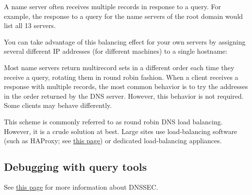 \protect\hypertarget{part0024_split_017.htmlux5cux23_idIndexMarker2045}{}{}\protect\hypertarget{part0024_split_017.htmlux5cux23_idIndexMarker2046}{}{}A\protect\hypertarget{part0024_split_017.htmlux5cux23_idIndexMarker2047}{}{}
name server often receives multiple records in response to a query. For
example, the response to a query for the name servers of the root domain
would list all 13 servers.

You can take advantage of this balancing effect for your own servers by
assigning several different IP addresses (for different machines) to a
single hostname:


Most name servers return multirecord sets in a different order each time
they receive a query, rotating them in round robin fashion. When a
client receives a response with multiple records, the most common
behavior is to try the addresses in the order returned by the DNS
server. However, this behavior is not required. Some clients may behave
differently.

This scheme is commonly referred to as round robin DNS load balancing.
However, it is a crude solution at best. Large sites use load-balancing
software (such as HAProxy; see
\protect\hyperlink{part0027_split_030.htmlux5cux23_idTextAnchor1269}{this
page}) or dedicated load-balancing appliances.

\protect\hypertarget{part0024_split_018.html}{}{}

\hypertarget{part0024_split_018.htmlux5cux23_idContainer1069}{}
\hypertarget{part0024_split_018.htmlux5cux23calibre_pb_17}{%
\subsection[Debugging with query
tools]{\texorpdfstring{\protect\hypertarget{part0024_split_018.htmlux5cux23_idTextAnchor863}{}{}Debugging
with query
tools}{Debugging with query tools}}\label{part0024_split_018.htmlux5cux23calibre_pb_17}}

\leavevmode\hypertarget{part0024_split_018.htmlux5cux23_idContainer920}{}%
See
\protect\hyperlink{part0024_split_059.htmlux5cux23_idTextAnchor938}{this
page} for more information about DNSSEC.

